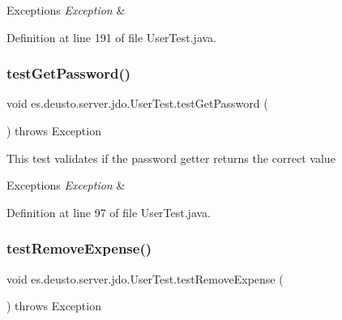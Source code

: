 \begin{DoxyExceptions}{Exceptions}
{\em Exception} & \\
\hline
\end{DoxyExceptions}


Definition at line 191 of file User\+Test.\+java.

\mbox{\label{classes_1_1deusto_1_1server_1_1jdo_1_1_user_test_a81ad692662774db5d47e857d45320e2b}} 
\subsubsection{\texorpdfstring{test\+Get\+Password()}{testGetPassword()}}
{\footnotesize\ttfamily void es.\+deusto.\+server.\+jdo.\+User\+Test.\+test\+Get\+Password (\begin{DoxyParamCaption}{ }\end{DoxyParamCaption}) throws Exception}

This test validates if the password getter returns the correct value 
\begin{DoxyExceptions}{Exceptions}
{\em Exception} & \\
\hline
\end{DoxyExceptions}


Definition at line 97 of file User\+Test.\+java.

\mbox{\label{classes_1_1deusto_1_1server_1_1jdo_1_1_user_test_acc8ecd1dc930429a2247c34047f4b66d}} 
\subsubsection{\texorpdfstring{test\+Remove\+Expense()}{testRemoveExpense()}}
{\footnotesize\ttfamily void es.\+deusto.\+server.\+jdo.\+User\+Test.\+test\+Remove\+Expense (\begin{DoxyParamCaption}{ }\end{DoxyParamCaption}) throws Exception}

